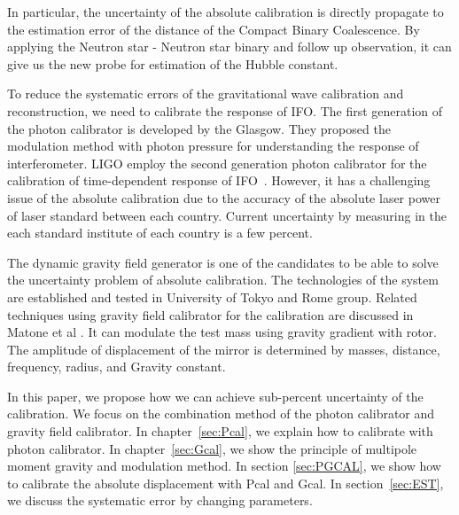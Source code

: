 \documentclass[A4]{spie}  %
\begin{document}
In particular, the uncertainty of the absolute calibration is directly propagate to the estimation error of the distance of the Compact Binary Coalescence. By applying the Neutron star - Neutron star binary and follow up observation, it can give us the new probe for estimation of the Hubble constant.

To reduce the systematic errors of the gravitational wave calibration and reconstruction, we need to calibrate the response of IFO. The first generation of the photon calibrator is developed by the Glasgow. They proposed the modulation method with photon pressure for understanding the response of interferometer. LIGO employ the second generation photon calibrator for the calibration of time-dependent response of IFO~\cite{doi:10.1063/1.4967303}.  However, it has a challenging issue of the absolute calibration due to the accuracy of the absolute laser power of laser standard between each country. Current uncertainty by measuring in the each standard institute of each country is a few percent.

The dynamic gravity field generator is one of the candidates to be able to solve the uncertainty problem of absolute calibration. The technologies of the system are established and tested in University of Tokyo and Rome group. Related techniques using gravity field calibrator for the calibration are discussed in Matone et al \cite{0264-9381-24-9-005}. It can modulate the test mass using gravity gradient with rotor. The amplitude of displacement of the mirror is determined by masses, distance, frequency, radius, and Gravity constant. 

In this paper, we propose how we can achieve sub-percent uncertainty of the calibration. We focus on the combination method of the photon calibrator and gravity field calibrator.
In chapter~\ref{sec:Pcal}, we explain how to calibrate with photon calibrator. In chapter~\ref{sec:Gcal}, we show the principle of multipole moment gravity and modulation method.
In section \ref{sec:PGCAL}, we show how to calibrate the absolute displacement with Pcal and Gcal. In section~\ref{sec:EST}, we discuss the systematic error by changing parameters.
\end{document}
